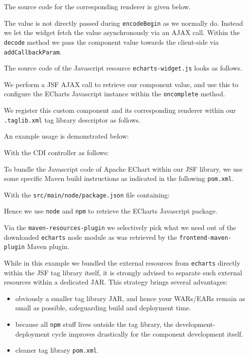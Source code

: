 The source code for the corresponding renderer is given below.

The value is not directly passed during \texttt{encodeBegin} as we normally do.
Instead we let the widget fetch the value asynchronously via an AJAX call.
Within the \texttt{decode} method we pass the component value towards the client-side via \texttt{addCallbackParam}.

The source code of the Javascript resource \texttt{echarts-widget.js} looks as follows.

We perform a JSF AJAX call to retrieve our component value, and use this to configure the ECharts Javascript instance within the \texttt{oncomplete} method.

We register this custom component and its corresponding renderer within our \texttt{.taglib.xml} tag library descriptor as follows.


An example usage is demonstrated below:


With the CDI controller as follows:


To bundle the Javascript code of Apache EChart within our JSF library, we use some specific Maven build instructions as indicated in the following \texttt{pom.xml}.

With the \texttt{src/main/node/package.json} file containing:

Hence we use \texttt{node} and \texttt{npm} to retrieve the ECharts Javascript package.

Via the \texttt{maven-resources-plugin} we selectively pick what we need out of the downloaded \texttt{echarts} node module as was retrieved by the \texttt{frontend-maven-plugin} Maven plugin.

While in this example we bundled the external resources from \texttt{echarts} directly within the JSF tag library itself,
it is strongly advised to separate such external resources within a dedicated JAR.
This strategy brings several advantages:
\begin{itemize}
	\item obviously a smaller tag library JAR, and hence your WARs/EARs remain as small as possible, safeguarding build and deployment time.
	\item because all \texttt{npm} stuff lives outside the tag library, the development-deployment cycle improves drastically for the component development itself.
	\item cleaner tag library \texttt{pom.xml}.
\end{itemize}